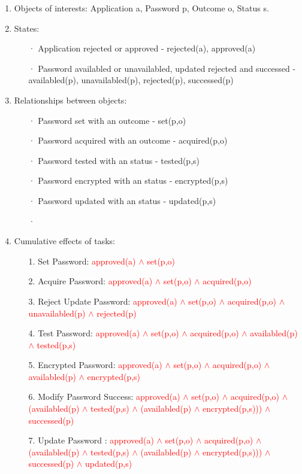 \documentclass[11pt]{article}
\begin{document}
\begin{enumerate}
\begin{enumerate}
      \item Objects of interests: Application a, Password p, Outcome o, Status s.
      \item States:
          \begin{itemize}
              \item[·] Application rejected or approved - rejected(a), approved(a)
              \item[·] Password availabled or unavailabled, updated rejected and successed - availabled(p), unavailabled(p), rejected(p), successed(p)
          \end{itemize}
      \item Relationships between objects:
          \begin{itemize}
              \item[·] Password set with an outcome - set(p,o)
              \item[·] Password acquired with an outcome - acquired(p,o)
              \item[·] Password tested with an status - tested(p,s)
              \item[·] Password encrypted with an status - encrypted(p,s) 
              \item[·] Password updated with an status - updated(p,s)
              \item[·] 
          \end{itemize}
      \item Cumulative effects of tasks:
          \begin{enumerate}
            \item[1.] Set Password: \textcolor{red}{approved(a) $\land$ set(p,o)}
            \item[2.] Acquire Password: \textcolor{red}{approved(a) $\land$ set(p,o) $\land$ acquired(p,o)}
            \item[3.] Reject Update Password: \textcolor{red}{approved(a) $\land$ set(p,o) $\land$ acquired(p,o) $\land$ unavailabled(p) $\land$ rejected(p)} 
            \item[4.] Test Password: \textcolor{red}{approved(a) $\land$ set(p,o) $\land$ acquired(p,o) $\land$ availabled(p) $\land$ tested(p,s)} 
            \item[5.] Encrypted Password: \textcolor{red}{approved(a) $\land$ set(p,o) $\land$ acquired(p,o) $\land$ availabled(p) $\land$ encrypted(p,s)} 
            \item[6.] Modify Password Success: \textcolor{red}{approved(a) $\land$ set(p,o) $\land$ acquired(p,o) $\land$ (availabled(p) $\land$ tested(p,s) $\land$ (availabled(p) $\land$ encrypted(p,s))) $\land$ successed(p)}
            \item[7.] Update Password : \textcolor{red}{approved(a) $\land$ set(p,o) $\land$ acquired(p,o) $\land$ (availabled(p) $\land$ tested(p,s) $\land$ (availabled(p) $\land$ encrypted(p,s))) $\land$ successed(p) $\land$ updated(p,s)}

            
        \end{enumerate}
  \end{enumerate}
  



\end{enumerate}
\end{document}
